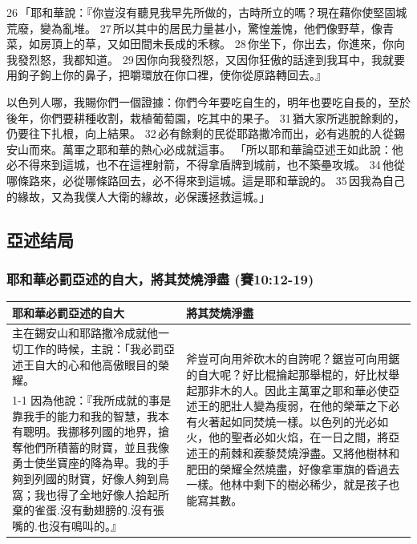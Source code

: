 26 「耶和華說：『你豈沒有聽見我早先所做的，古時所立的嗎？現在藉你使堅固城荒廢，變為亂堆。 27 所以其中的居民力量甚小，驚惶羞愧，他們像野草，像青菜，如房頂上的草，又如田間未長成的禾稼。 28 你坐下，你出去，你進來，你向我發烈怒，我都知道。 29 因你向我發烈怒，又因你狂傲的話達到我耳中，我就要用鉤子鉤上你的鼻子，把嚼環放在你口裡，使你從原路轉回去。』

以色列人哪，我賜你們一個證據：你們今年要吃自生的，明年也要吃自長的，至於後年，你們要耕種收割，栽植葡萄園，吃其中的果子。 31 猶大家所逃脫餘剩的，仍要往下扎根，向上結果。 32 必有餘剩的民從耶路撒冷而出，必有逃脫的人從錫安山而來。萬軍之耶和華的熱心必成就這事。
「所以耶和華論亞述王如此說：他必不得來到這城，也不在這裡射箭，不得拿盾牌到城前，也不築壘攻城。 34 他從哪條路來，必從哪條路回去，必不得來到這城。這是耶和華說的。 35 因我為自己的緣故，又為我僕人大衛的緣故，必保護拯救這城。」






\subsection{亞述结局}
\subsubsection{耶和華必罰亞述的自大，將其焚燒淨盡 (賽10:12-19)}
\begin{table}[H]
\centering 
\begin{tabular}{p{8.5cm}|p{8.75cm}}\hline\hline
耶和華必罰亞述的自大&將其焚燒淨盡\\\hline
主在錫安山和耶路撒冷成就他一切工作的時候，主說：「我必罰亞述王自大的心和他高傲眼目的榮耀。
&\multirow{2}{8.9cm}{斧豈可向用斧砍木的自誇呢？鋸豈可向用鋸的自大呢？好比棍掄起那舉棍的，好比杖舉起那非木的人。因此主萬軍之耶和華必使亞述王的肥壯人變為瘦弱，在他的榮華之下必有火著起如同焚燒一樣。以色列的光必如火，他的聖者必如火焰，在一日之間，將亞述王的荊棘和蒺藜焚燒淨盡。又將他樹林和肥田的榮耀全然燒盡，好像拿軍旗的昏過去一樣。他林中剩下的樹必稀少，就是孩子也能寫其數。}\\\cline{1-1}
因為他說：『我所成就的事是靠我手的能力和我的智慧，我本有聰明。我挪移列國的地界，搶奪他們所積蓄的財寶，並且我像勇士使坐寶座的降為卑。我的手夠到列國的財寶，好像人夠到鳥窩；我也得了全地好像人拾起所棄的雀蛋.沒有動翅膀的.沒有張嘴的.也沒有鳴叫的。』&\\\hline
\end{tabular}
\end{table}

